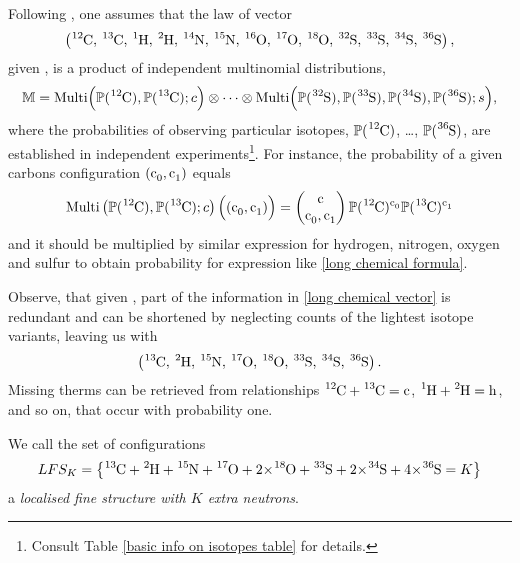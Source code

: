 Following \cite{Kienitz1961MassSpectrometry}, one assumes that the law of vector
\begin{equation}\label{long chemical vector}
	\left( \cem{^{12}C},\, \cem{^{13}C},\, \cem{^{1}H},\, \cem{^{2}H},\, \cem{^{14}N},\, \cem{^{15}N},\, \cem{^{16}O},\, \cem{^{17}O},\, \cem{^{18}O},\, \cem{^{32}S},\, \cem{^{33}S},\, \cem{^{34}S},\, \cem{^{36}S} \right),	
\end{equation}
given \molecule, is a product of independent multinomial distributions,
{\small\begin{equation}\label{product of multinomials}
	\mathbb{M} = \mathrm{Multi} \Big( \prob(\cem{^{12}C}), \prob(\cem{^{13}C}); c \Big)
	\otimes \dots \otimes 
	\mathrm{Multi} \Big( \prob(\cem{^{32}S}), \prob(\cem{^{33}S}), \prob(\cem{^{34}S}), \prob(\cem{^{36}S}); s \Big),	
\end{equation}}
where the probabilities of observing particular isotopes, $\prob(\cem{^{12}C})$, \dots, $\prob(\cem{^{36}S})$, are established in independent experiments\footnote{Consult Table \ref{basic info on isotopes table} for details.}. For instance, the probability of a given carbons configuration $(\cem{c_0}, \cem{c_1})$ equals
\begin{equation*}
	\mathrm{Multi} \left( \prob(\cem{^{12}C}), \prob(\cem{^{13}C}); c \right)
		\Big( (\cem{c_0}, \cem{c_1}) \Big) = 
	\begin{pmatrix}
		\cem{c} \cr \cem{c_0}, \cem{c_1}  
	\end{pmatrix} \prob(\cem{^{12}C})^\cem{c_0} \prob(\cem{^{13}C})^\cem{c_1}
\end{equation*}
and it should be multiplied by similar expression for hydrogen, nitrogen, oxygen and sulfur to obtain probability for expression like \eqref{long chemical formula}.


Observe, that given \molecule, part of the information in \eqref{long chemical vector} is redundant and can be shortened by neglecting counts of the lightest isotope variants, leaving us with 
\begin{equation}\label{short chemical vector}
 	\left( \cem{^{13}C},\, \cem{^{2}H},\, \cem{^{15}N},\, \cem{^{17}O},\, \cem{^{18}O},\, \cem{^{33}S},\, \cem{^{34}S},\, \cem{^{36}S} \right).	
\end{equation}
Missing therms can be retrieved from relationships $\cem{^{12}C} + \cem{^{13}C} = \cem{c}$, $\cem{^{1}H} + \cem{^{2}H} = \cem{h}$, and so on, that occur with probability one.

\begin{mydef}\label{localised fine structure definition}
	We call the set of configurations  
	{\small
		\begin{equation}\label{LFS_K}
			LFS_K	=
			\left\{ 
				\cem{^{13}C} + \cem{^{2}H} +  \cem{^{15}N} +  \cem{^{17}O} +  \cem{2 $\times$^{18}O} +  \cem{^{33}S} +  \cem{2 $\times$^{34}S} + \cem{4 $\times$^{36}S} = K	
			\right\}
		\end{equation}
	}
	a \emph{localised fine structure with $K$ extra neutrons}.  	
\end{mydef}

